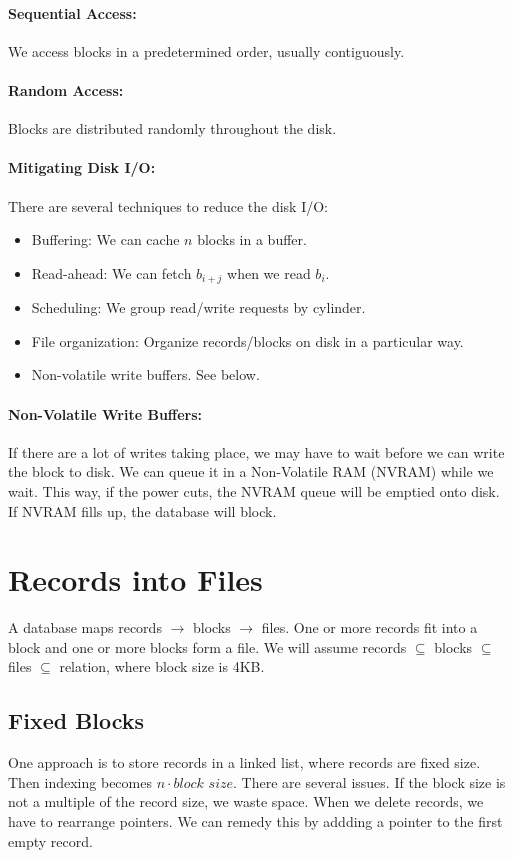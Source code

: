 \documentclass{report}
\renewcommand{\it}[1]{\textit{{#1}}}
\begin{document}
\paragraph{Sequential Access:} We access blocks in a predetermined order,
usually contiguously.

\paragraph{Random Access:} Blocks are distributed randomly throughout the disk.

\paragraph{Mitigating Disk I/O:} There are several techniques to reduce the
disk I/O:
\begin{itemize}[label=$\to$]
    \item Buffering: We can cache $n$ blocks in a buffer.
    \item Read-ahead: We can fetch $b_{i + j}$ when we read $b_i$.
    \item Scheduling: We group read/write requests by cylinder.
    \item File organization: Organize records/blocks on disk in a particular
        way.
    \item Non-volatile write buffers. See below.
\end{itemize}

\paragraph{Non-Volatile Write Buffers:} If there are a lot of writes taking
place, we may have to wait before we can write the block to disk. We can queue
it in a Non-Volatile RAM (NVRAM) while we wait. This way, if the power cuts, the
NVRAM queue will be emptied onto disk. If NVRAM fills up, the database will
block.

\section{Records into Files}
A database maps records $\to$ blocks $\to$ files. One or more records fit into a
block and one or more blocks form a file. We will assume records $\subseteq$
blocks $\subseteq$ files $\subseteq$ relation, where block size is 4KB.

\subsection{Fixed Blocks}
One approach is to store records in a linked list, where records are fixed size.
Then indexing becomes $n \cdot \it{block size}$. There are several issues. If
the block size is not a multiple of the record size, we waste space. When we
delete records, we have to rearrange pointers. We can remedy this by addding a
pointer to the first empty record.
\end{document}
